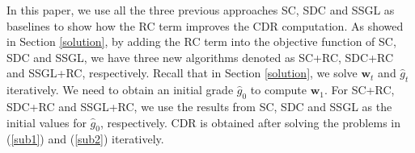 \documentclass[journal]{IEEEtran}
\begin{document}
   In this paper, we use all the three previous approaches SC, SDC and SSGL as baselines to show how the RC term improves the CDR computation. As showed in Section \ref{solution}, by adding the RC term into the objective function of SC, SDC and SSGL,  we have three new algorithms  denoted as SC+RC, SDC+RC and SSGL+RC, respectively.   Recall that in Section \ref{solution}, we solve $\textbf{w}_t$ and $\hat{g}_t$ iteratively. We need to obtain an initial grade $\hat{g}_0$ to compute $\textbf{w}_1$. For SC+RC, SDC+RC and SSGL+RC, we use the results from SC, SDC and SSGL as the initial values for $\hat{g}_0$, respectively.
    CDR is obtained after  solving the problems in (\ref{sub1}) and (\ref{sub2}) iteratively.
%
%
%
\end{document}
